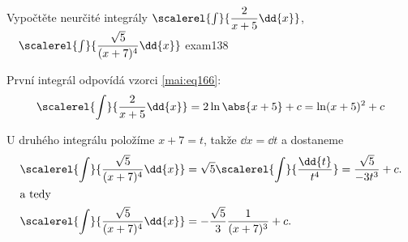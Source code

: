 \begin{mathexam}{Vypočtěte neurčité integrály \(\protect\scalerel{\int}{\dfrac{2}{x+5}\dd{x}}\),
  \(\quad\protect\scalerel{\int}{\dfrac{\sqrt{5}}{(x+7)^4}\dd{x}}\) \hfill\cite[s.~71]{Knichal}}{exam138}

  První integrál odpovídá vzorci \ref{mai:eq166}:
  \begin{equation*}
    \scalerel{\int}{\dfrac{2}{x+5}\dd{x}} = 2\ln\abs{x+5} + c = \ln(x+5)^2 + c
  \end{equation*}

  U druhého integrálu položíme \(x+7 = t\), takže \(\dd{x} = \dd{t}\) a dostaneme
  \begin{align*}
    \scalerel{\int}{\dfrac{\sqrt{5}}{(x+7)^4}\dd{x}} &= 
    \sqrt{5}\scalerel{\int}{\dfrac{\dd{t}}{t^4}} = \dfrac{\sqrt{5}}{-3t^3} + c.   \\
    \shortintertext{a tedy}
    \scalerel{\int}{\dfrac{\sqrt{5}}{(x+7)^4}\dd{x}} &=-\dfrac{\sqrt{5}}{3}\dfrac{1}{(x+7)^3} + c.
  \end{align*}
\end{mathexam}